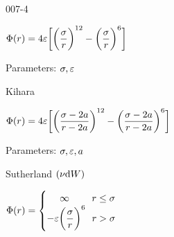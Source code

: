 \begin{mitframe}{007-4}
\begin{listone}
\begin{listtwo}
    	\end{listtwo}
        
    	\item {}
    
   		\begin{listtwo}
        
    		\item $\pot(\pos) = 4\partpoten\bigg[\bigg(\dfrac{\molecrad}{\pos}\bigg)^{12}-\bigg(\dfrac{\molecrad}{\pos}\bigg)^6\bigg] $
    
    		\item Parameters: $\molecrad, \partpoten$

    
    	\end{listtwo}
    
    	\item Kihara
    
    	\begin{listtwo}
    
    		\item $\pot(\pos) = 4\partpoten\bigg[\bigg(\dfrac{\molecrad-2\sphcorerad}{\pos-2\sphcorerad}\bigg)^{12}-\bigg(\dfrac{\molecrad-2\sphcorerad}{\pos-2\sphcorerad}\bigg)^6\bigg] $
    
    		\item Parameters: $\molecrad, \partpoten, \sphcorerad$

        
    	\end{listtwo}
    
   		\item Sutherland $(\freq \mathrm{d}\work)$
    
    	\begin{listtwo}
    
    		\item $\pot(\pos)=\begin{cases}
                    ~~~~\infty ~~~~~~~ \pos \leq \molecrad\\
                    -\partpoten\bigg(\dfrac{\molecrad}{\pos}\bigg)^6 ~~ \pos > \molecrad\\
                \end{cases}$
                

\end{listtwo}
\end{listone}
\end{mitframe}
